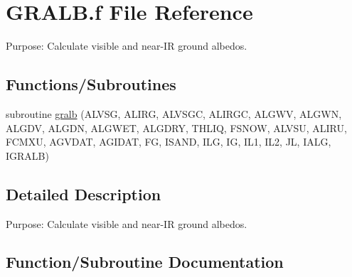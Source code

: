 \hypertarget{GRALB_8f}{}\section{G\+R\+A\+L\+B.\+f File Reference}
\label{GRALB_8f}


Purpose\+: Calculate visible and near-\/\+I\+R ground albedos.  


\subsection*{Functions/\+Subroutines}
\begin{DoxyCompactItemize}
\item 
subroutine \hyperlink{GRALB_8f_af8208db48e4bd17f925ba5a654bce8bf}{gralb} (A\+L\+V\+S\+G, A\+L\+I\+R\+G, A\+L\+V\+S\+G\+C, A\+L\+I\+R\+G\+C, A\+L\+G\+W\+V, A\+L\+G\+W\+N, A\+L\+G\+D\+V, A\+L\+G\+D\+N, A\+L\+G\+W\+E\+T, A\+L\+G\+D\+R\+Y, T\+H\+L\+I\+Q, F\+S\+N\+O\+W, A\+L\+V\+S\+U, A\+L\+I\+R\+U, F\+C\+M\+X\+U, A\+G\+V\+D\+A\+T, A\+G\+I\+D\+A\+T, F\+G, I\+S\+A\+N\+D, I\+L\+G, I\+G, I\+L1, I\+L2, J\+L, I\+A\+L\+G, I\+G\+R\+A\+L\+B)
\end{DoxyCompactItemize}


\subsection{Detailed Description}
Purpose\+: Calculate visible and near-\/\+I\+R ground albedos. 



\subsection{Function/\+Subroutine Documentation}
\hypertarget{GRALB_8f_af8208db48e4bd17f925ba5a654bce8bf}{}
